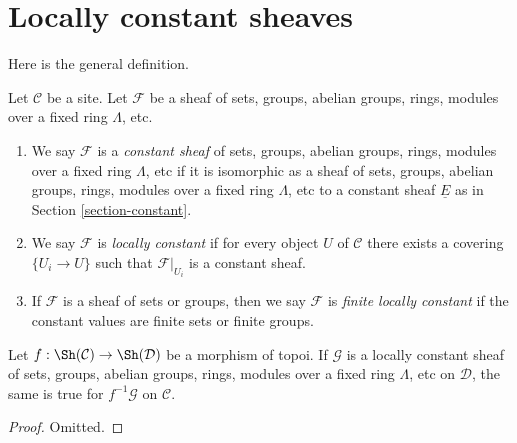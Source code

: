 \section{Locally constant sheaves}
\label{section-locally-constant}

\noindent
Here is the general definition.

\begin{definition}
\label{definition-locally-constant}
Let $\mathcal{C}$ be a site. Let $\mathcal{F}$ be a sheaf of sets, groups,
abelian groups, rings, modules over a fixed ring $\Lambda$, etc.
\begin{enumerate}
\item We say $\mathcal{F}$ is a
{\it constant sheaf} of
sets, groups, abelian groups, rings, modules over a fixed ring $\Lambda$, etc
if it is isomorphic as a sheaf of
sets, groups, abelian groups, rings, modules over a fixed ring $\Lambda$, etc
to a constant sheaf $\underline{E}$ as in Section \ref{section-constant}.
\item We say $\mathcal{F}$ is {\it locally constant} if for every object
$U$ of $\mathcal{C}$ there exists a
covering $\{U_i \to U\}$ such that $\mathcal{F}|_{U_i}$ is a constant sheaf.
\item If $\mathcal{F}$ is a sheaf of sets or groups, then we say $\mathcal{F}$
is {\it finite locally constant} if the constant values are finite sets or
finite groups.
\end{enumerate}
\end{definition}

\begin{lemma}
\label{lemma-pullback-locally-constant}
Let $f : \Sh(\mathcal{C}) \to \Sh(\mathcal{D})$ be a morphism of topoi.
If $\mathcal{G}$ is a locally constant sheaf of
sets, groups, abelian groups, rings, modules over a fixed ring $\Lambda$, etc
on $\mathcal{D}$, the same is true for $f^{-1}\mathcal{G}$
on $\mathcal{C}$.
\end{lemma}

\begin{proof}
Omitted.
\end{proof}

